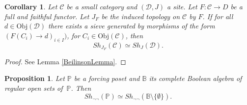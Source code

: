 \documentclass[10pt,a4paper]{amsart}
\newtheorem{Prop}[Theo]{Proposition}
\newtheorem{Corolary}[Theo]{Corollary}
\newcommand{\C}{\mathcal{C}}
\newcommand{\Po}{\mathbb{P}}
\newcommand{\B}{\mathbb{B}}
\newcommand{\D}{\mathcal{D}}
\begin{document}
\begin{Corolary}\label{comparisonlemma}
	Let $\C$ be a small category and $(\D,J)$ a site. Let $F: \C \to D$ be a full and faithful functor. Let $J_{F}$ be the induced topology on $\C$ by $F$. If for all $d \in \text{Obj}(\D)$ there exists a sieve generated by morphisms of the form $(F(C_{i}) \to d)_{i \in I})$, for $C_{i} \in \text{Obj}(\C)$, then
	$$Sh_{J_{F}}(\C) \simeq Sh_{J}(\D).$$
\end{Corolary}

\begin{proof}
	See Lemma \ref{BeilinsonLemma}.
\end{proof}

\begin{Prop}
    \label{sheavesposetalgebrasem0}
	Let $\Po$ be a forcing poset and $\B$ its complete Boolean algebra of regular open sets of $~\Po$. Then
	$$Sh_{\neg \neg}(\Po) \simeq Sh_{\neg \neg}(\B \setminus \{ \emptyset\}).$$
\end{Prop}
\end{document}
